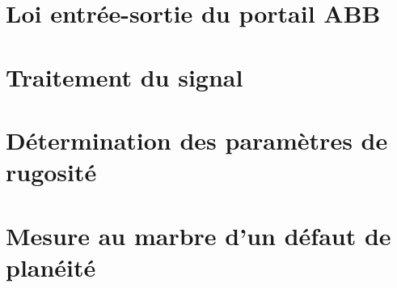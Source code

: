 \documentclass[10pt,fleqn]{article} %
\begin{document}



\section{Loi entrée-sortie du portail ABB}



\section{Traitement du signal }%


\section{Détermination des paramètres de rugosité}

\newpage
\section{Mesure au marbre d'un défaut de planéité}
\end{document}
